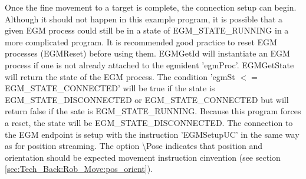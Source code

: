 \documentclass{cslthse-msc}
\begin{document}
Once the fine movement to a target is complete, the connection setup can begin. Although it should not happen in this example program, it is possible that a given EGM process could still be in a state of {\scriptsize{EGM\_STATE\_RUNNING}} in a more complicated program. It is recommended good practice to reset EGM processes (EGMReset) before using them. EGMGetId will instantiate an EGM process if one is not already attached to the egmident 'egmProc'. EGMGetState will return the state of the EGM process. The condition 'egmSt $<=$ {\scriptsize{EGM\_STATE\_CONNECTED}}' will be true if the state is {\scriptsize{EGM\_STATE\_DISCONNECTED}} or {\scriptsize{EGM\_STATE\_CONNECTED}} but will return false if the sate is {\scriptsize{EGM\_STATE\_RUNNING}}. Because this program forces a reset, the state will be {\scriptsize{EGM\_STATE\_DISCONNECTED}}. The connection to the EGM endpoint is setup with the instruction 'EGMSetupUC' in the same way as for position streaming. The option \textbackslash Pose indicates that position and orientation should be expected movement instruction cinvention (see section \ref{sec:Tech_Back:Rob_Move:pos_orient}). \par
\end{document}
